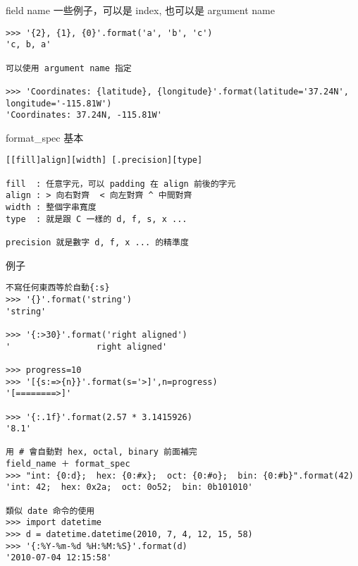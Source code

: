 field name 一些例子，可以是 index, 也可以是 argument name
\begin{verbatim}
>>> '{2}, {1}, {0}'.format('a', 'b', 'c')
'c, b, a'

可以使用 argument name 指定

>>> 'Coordinates: {latitude}, {longitude}'.format(latitude='37.24N', longitude='-115.81W')
'Coordinates: 37.24N, -115.81W'
\end{verbatim}
format\_spec 基本
\begin{verbatim}
[[fill]align][width] [.precision][type]

fill  : 任意字元，可以 padding 在 align 前後的字元
align : > 向右對齊  < 向左對齊 ^ 中間對齊
width : 整個字串寬度
type  : 就是跟 C 一樣的 d, f, s, x ...

precision 就是數字 d, f, x ... 的精準度
\end{verbatim}
例子
\begin{verbatim}
不寫任何東西等於自動{:s}
>>> '{}'.format('string')
'string'

>>> '{:>30}'.format('right aligned')
'                 right aligned'

>>> progress=10
>>> '[{s:=>{n}}'.format(s='>]',n=progress)
'[========>]'

>>> '{:.1f}'.format(2.57 * 3.1415926)
'8.1'

用 # 會自動對 hex, octal, binary 前面補完
field_name ＋ format_spec
>>> "int: {0:d};  hex: {0:#x};  oct: {0:#o};  bin: {0:#b}".format(42)
'int: 42;  hex: 0x2a;  oct: 0o52;  bin: 0b101010'

類似 date 命令的使用
>>> import datetime
>>> d = datetime.datetime(2010, 7, 4, 12, 15, 58)
>>> '{:%Y-%m-%d %H:%M:%S}'.format(d)
'2010-07-04 12:15:58'
\end{verbatim}

